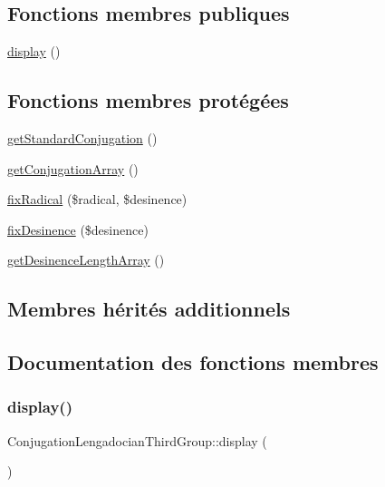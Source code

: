 \subsection*{Fonctions membres publiques}
\begin{DoxyCompactItemize}
\item 
\hyperlink{class_conjugation_lengadocian_third_group_a13c6997dad7cbe8c53fe4ecbad7367ab}{display} ()
\end{DoxyCompactItemize}
\subsection*{Fonctions membres protégées}
\begin{DoxyCompactItemize}
\item 
\hyperlink{class_conjugation_lengadocian_third_group_a74123f02b8ac3ab7730bbc935acaefd5}{get\+Standard\+Conjugation} ()
\item 
\hyperlink{class_conjugation_lengadocian_third_group_a11aedf41cff74c08a1bfd25ac5ce8709}{get\+Conjugation\+Array} ()
\item 
\hyperlink{class_conjugation_lengadocian_third_group_a24ef94ab2752b9ab2eadbefda6ddd959}{fix\+Radical} (\$radical, \$desinence)
\item 
\hyperlink{class_conjugation_lengadocian_third_group_a6c1f315bacb649a252e5058a28f46141}{fix\+Desinence} (\$desinence)
\item 
\hyperlink{class_conjugation_lengadocian_third_group_a728d85569c753bf2a42e963e51aeadfa}{get\+Desinence\+Length\+Array} ()
\end{DoxyCompactItemize}
\subsection*{Membres hérités additionnels}


\subsection{Documentation des fonctions membres}
\hypertarget{class_conjugation_lengadocian_third_group_a13c6997dad7cbe8c53fe4ecbad7367ab}{}\label{class_conjugation_lengadocian_third_group_a13c6997dad7cbe8c53fe4ecbad7367ab} 
\subsubsection{\texorpdfstring{display()}{display()}}
{\footnotesize\ttfamily Conjugation\+Lengadocian\+Third\+Group\+::display (\begin{DoxyParamCaption}{ }\end{DoxyParamCaption})}



